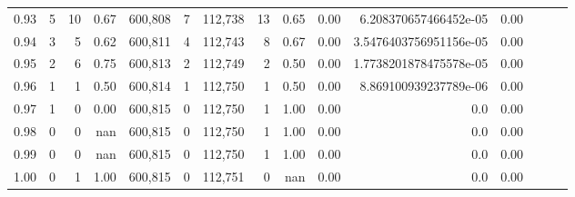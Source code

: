 \begin{tabular}{rrrrrrrrrrrrrrr}
0.93 &       5 &     10 &  0.67 &  600,808 &        7 &  112,738 &       13 &  0.65 &  0.00 &   6.208370657466452e-05 &      0.00 \\
0.94 &       3 &      5 &  0.62 &  600,811 &        4 &  112,743 &        8 &  0.67 &  0.00 &  3.5476403756951156e-05 &      0.00 \\
0.95 &       2 &      6 &  0.75 &  600,813 &        2 &  112,749 &        2 &  0.50 &  0.00 &  1.7738201878475578e-05 &      0.00 \\
0.96 &       1 &      1 &  0.50 &  600,814 &        1 &  112,750 &        1 &  0.50 &  0.00 &   8.869100939237789e-06 &      0.00 \\
0.97 &       1 &      0 &  0.00 &  600,815 &        0 &  112,750 &        1 &  1.00 &  0.00 &                     0.0 &      0.00 \\
0.98 &       0 &      0 &   nan &  600,815 &        0 &  112,750 &        1 &  1.00 &  0.00 &                     0.0 &      0.00 \\
0.99 &       0 &      0 &   nan &  600,815 &        0 &  112,750 &        1 &  1.00 &  0.00 &                     0.0 &      0.00 \\
1.00 &       0 &      1 &  1.00 &  600,815 &        0 &  112,751 &        0 &   nan &  0.00 &                     0.0 &      0.00 \\
\bottomrule
\end{tabular}
